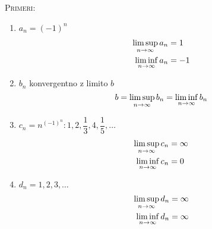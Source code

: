 \textsc{Primeri:}
\begin{enumerate}[1)]
	\item $a_n = (-1)^n$
	\begin{align*}
	\limsup_{n \rightarrow \infty} a_n &= 1 \\
	\liminf_{n \rightarrow \infty} a_n &= -1 \\
	\end{align*}
	
	\item $b_n$ konvergentno z limito $b$
	\begin{equation*}
	b = \limsup_{n \rightarrow \infty} b_n = \liminf_{n \rightarrow \infty} b_n
	\end{equation*}
	
	\item $c_n = n^{(-1)^n}: 1, 2, \dfrac{1}{3}, 4, \dfrac{1}{5}, \ldots$
	\begin{align*}
	\limsup_{n \rightarrow \infty} c_n &= \infty \\
	\liminf_{n \rightarrow \infty} c_n &= 0
	\end{align*}
	
	\item $d_n = 1, 2, 3, \ldots$
	\begin{align*}
	\limsup_{n \rightarrow \infty} d_n &= \infty \\
	\liminf_{n \rightarrow \infty} d_n &=\infty
	\end{align*}
\end{enumerate}
